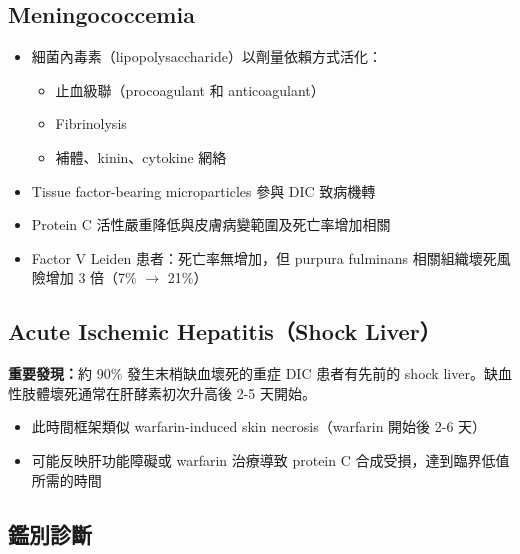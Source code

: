 \documentclass[12pt,a4paper]{article}
\begin{document}
\subsection{Meningococcemia}

\begin{itemize}
    \item 細菌內毒素（lipopolysaccharide）以劑量依賴方式活化：
    \begin{itemize}
        \item 止血級聯（procoagulant 和 anticoagulant）
        \item Fibrinolysis
        \item 補體、kinin、cytokine 網絡
    \end{itemize}
    \item Tissue factor-bearing microparticles 參與 DIC 致病機轉
    \item Protein C 活性嚴重降低與皮膚病變範圍及死亡率增加相關
    \item Factor V Leiden 患者：死亡率無增加，但 purpura fulminans 相關組織壞死風險增加 3 倍（7\% $\rightarrow$ 21\%）
\end{itemize}

\subsection{Acute Ischemic Hepatitis（Shock Liver）}

\begin{importantbox}
\textbf{重要發現：}約 90\% 發生末梢缺血壞死的重症 DIC 患者有先前的 shock liver。缺血性肢體壞死通常在肝酵素初次升高後 2-5 天開始。
\end{importantbox}

\begin{itemize}
    \item 此時間框架類似 warfarin-induced skin necrosis（warfarin 開始後 2-6 天）
    \item 可能反映肝功能障礙或 warfarin 治療導致 protein C 合成受損，達到臨界低值所需的時間
\end{itemize}

\subsection{鑑別診斷}
\end{document}
